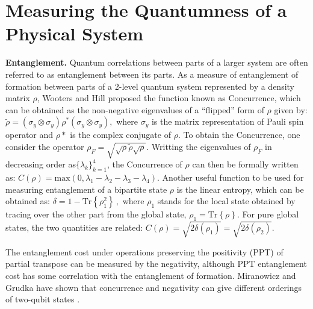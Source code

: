 \documentclass[aps,prl,preprint]{revtex4-1}
\newcommand{\Tr}[1]{ \mbox{Tr}\left\{ #1 \right\} }
\begin{document}
	\section{Measuring the Quantumness of a Physical System}
	
	\textbf{Entanglement.} Quantum correlations between parts of a larger system 
	are often referred to as entanglement between its parts. 
	As a measure of entanglement of formation between parts of a 2-level quantum system represented by
	a density matrix $\rho$,
	Wooters and Hill \cite{Wootters} proposed the function known as Concurrence, which can be obtained as the non-negative eigenvalues of a ``flipped'' form of $\rho$ given by:
	$\tilde{\rho}=(\sigma_{y}\otimes\sigma_{y})\rho^*(\sigma_{y}\otimes\sigma_{y}),$
	where $\sigma_{y}$ is the matrix representation of Pauli spin operator and $\rho *$ is the complex conjugate of $\rho$.
	To obtain the Concurrence, one consider the operator 
	$\rho_F = \sqrt{\sqrt{\rho}\tilde{\rho}\sqrt{\rho}}$.
	Writting the eigenvalues of $\rho_F$ in decreasing order
	as$\{\lambda_{k}\}_{k=1}^4$, 
	the Concurrence of $\rho$ can then be formally written as:
	$C(\rho)=\mbox{max}(0,\lambda_{1}-\lambda_{2}-\lambda_{3}-\lambda_{4})$.
	Another useful function to be used for measuring entanglement
	of a bipartite state $\rho$ is the linear entropy, which can be obtained as:
	$\delta = 1-\Tr{\rho_1^2}\, ,$
	where $\rho_1$ stands for the local state obtained by tracing over the
	other part from the global state, $\rho_1 = \Tr{\rho}$. For pure global states, the two quantities are related:
	$C(\rho) = \sqrt{2\delta(\rho_1)} = \sqrt{2\delta(\rho_2)}$.
	
	The entanglement cost under operations preserving the positivity (PPT) of partial transpose can be measured by the negativity, although  PPT entanglement cost has some correlation with the entanglement of
	formation.  Miranowicz and Grudka have shown that concurrence and negativity can give different orderings of two-qubit states \cite{Miranowicz}. 
	
\end{document}
